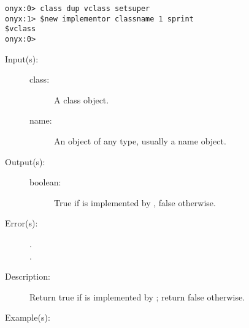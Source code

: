 \begin{description}
\begin{description}
\begin{verbatim}
onyx:0> class dup vclass setsuper
onyx:1> $new implementor classname 1 sprint
$vclass
onyx:0>
		\end{verbatim}
	\end{description}
\label{systemdict:implements}
\item[{\onyxop{class name}{implements}{boolean}}: ]
	\begin{description}\item[]
	\item[Input(s): ]
		\begin{description}\item[]
		\item[class: ]
			A class object.
		\item[name: ]
			An object of any type, usually a name object.
		\end{description}
	\item[Output(s): ]
		\begin{description}\item[]
		\item[boolean: ]
			True if  is implemented by ,
			false otherwise.
		\end{description}
	\item[Error(s): ]
		\begin{description}\item[]
		\item[.]
		\item[.]
		\end{description}
	\item[Description: ]
		Return true if  is implemented by ;
		return false otherwise.
	\item[Example(s): ]\begin{verbatim}


\end{verbatim}
\end{description}
\end{description}
